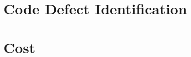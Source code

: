 \documentclass[11pt]{nmemo}
\begin{document}




\newpage
\section*{Code Defect Identification}









\newpage
\section*{Cost}




\end{document}
